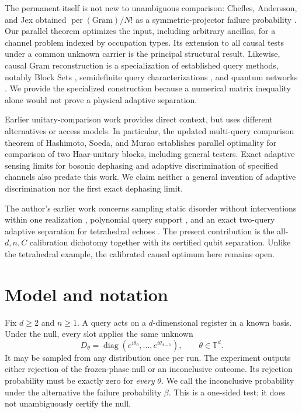 \documentclass[11pt,a4paper]{article}
\theoremstyle{remark}
\DeclareMathOperator{\per}{per}
\DeclareMathOperator{\diag}{diag}
\newcommand{\T}{\mathbb T}
\begin{document}
The permanent itself is not new to unambiguous comparison: Chefles,
Andersson, and Jex obtained \(\per(\mathrm{Gram})/N!\) as a symmetric-projector
failure probability \cite[Eq.~(4.10)]{chefles}. Our parallel theorem optimizes
the input, including arbitrary ancillas, for a channel problem indexed by
occupation types. Its extension to all causal tests under a common
unknown carrier is the principal structural result.
Likewise, causal Gram reconstruction is a specialization of established
query methods, notably Block Sets \cite[Definition~2, Theorems~2--3]{grillo},
semidefinite query characterizations \cite{barnum}, and quantum networks
\cite{combs}. We provide the specialized construction because a numerical
matrix inequality alone would not prove a physical adaptive separation.

Earlier unitary-comparison work \cite{andersson,sedlak,hashimoto} provides
direct context, but uses different alternatives or access models.
In particular, the updated multi-query comparison theorem of
Hashimoto, Soeda, and Murao \cite{hashimoto} establishes parallel optimality
for comparison of two Haar-unitary blocks, including general testers.
Exact adaptive sensing limits for bosonic dephasing \cite{huang} and
adaptive discrimination of specified channels \cite{sieniawski} also
predate this work. We claim neither a general invention of adaptive
discrimination nor the first exact dephasing limit.

The author's earlier work concerns sampling static disorder without
interventions within one realization \cite{sampling}, polynomial query
support \cite{support}, and an exact two-query adaptive separation for
tetrahedral echoes \cite{tetrahedral}. The present contribution is the
all-\(d,n,C\) calibration dichotomy together with its certified qubit
separation. Unlike the tetrahedral example, the calibrated causal optimum
here remains open.

\section{Model and notation}

Fix \(d\geq2\) and \(n\geq1\). A query acts on a \(d\)-dimensional register
in a known basis. Under the null, every slot applies the same unknown
\[
 D_\theta=\diag(e^{i\theta_0},\ldots,e^{i\theta_{d-1}}),
 \qquad \theta\in\T^d.
\]
It may be sampled from any distribution once per run. The experiment
outputs either rejection of the frozen-phase null or an inconclusive
outcome. Its rejection probability must be exactly zero for \emph{every}
\(\theta\). We call the inconclusive probability under the alternative
the failure probability \(\beta\). This is a one-sided test; it does not
unambiguously certify the null.
\end{document}
